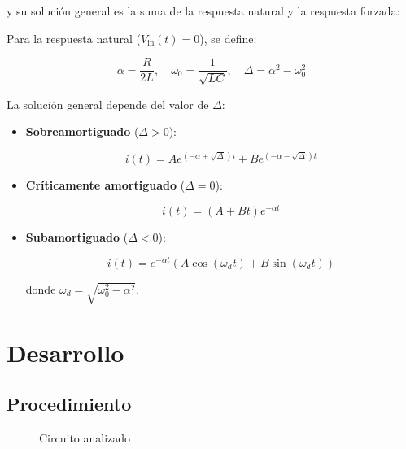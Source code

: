 \documentclass{article}
\begin{document}
        y su solución general es la suma de la respuesta natural y la respuesta forzada:

Para la respuesta natural (\( V_{\text{in}}(t) = 0 \)), se define:

\begin{equation}
\alpha = \frac{R}{2L}, \quad \omega_0 = \frac{1}{\sqrt{LC}}, \quad \Delta = \alpha^2 - \omega_0^2
\end{equation}

La solución general depende del valor de \( \Delta \):

\begin{itemize}
  \item \textbf{Sobreamortiguado} (\( \Delta > 0 \)):

  \begin{equation}
  i(t) = A e^{(-\alpha + \sqrt{\Delta})t} + B e^{(-\alpha - \sqrt{\Delta})t}
  \end{equation}

  \item \textbf{Críticamente amortiguado} (\( \Delta = 0 \)):

  \begin{equation}
  i(t) = (A + Bt)e^{-\alpha t}
  \end{equation}

  \item \textbf{Subamortiguado} (\( \Delta < 0 \)):

  \begin{equation}
  i(t) = e^{-\alpha t} \left( A \cos(\omega_d t) + B \sin(\omega_d t) \right)
  \end{equation}

  donde \( \omega_d = \sqrt{\omega_0^2 - \alpha^2} \).
\end{itemize}

\section{Desarrollo}
    \subsection{Procedimiento}

\begin{figure}[H]
    \centering
    \caption{Circuito analizado}
    \label{fig: circuito_rlc}
\end{figure}
\end{document}
